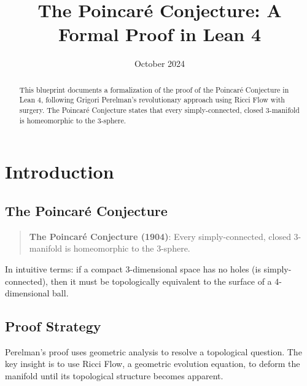 
\title{The Poincaré Conjecture: A Formal Proof in Lean 4}
\date{October 2024}

\maketitle

\begin{abstract}
This blueprint documents a formalization of the proof of the Poincaré Conjecture in Lean 4, following Grigori Perelman's revolutionary approach using Ricci Flow with surgery. The Poincaré Conjecture states that every simply-connected, closed 3-manifold is homeomorphic to the 3-sphere.
\end{abstract}

\tableofcontents

\chapter{Introduction}
\label{chap:introduction}

\section{The Poincaré Conjecture}

\begin{quote}
\textbf{The Poincaré Conjecture (1904)}: Every simply-connected, closed 3-manifold is homeomorphic to the 3-sphere.
\end{quote}

In intuitive terms: if a compact 3-dimensional space has no holes (is simply-connected), then it must be topologically equivalent to the surface of a 4-dimensional ball.

\section{Proof Strategy}

Perelman's proof uses geometric analysis to resolve a topological question. The key insight is to use Ricci Flow, a geometric evolution equation, to deform the manifold until its topological structure becomes apparent.

